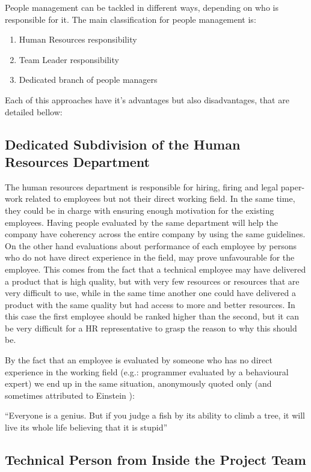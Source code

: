 People management can be tackled in different ways, depending on who is responsible for it. The main classification for people management is:
\begin{enumerate}
\item Human Resources responsibility
\item Team Leader responsibility 
\item Dedicated branch of people managers
\end{enumerate}

Each of this approaches have it's advantages but also disadvantages, that are detailed bellow:
\subsection{Dedicated Subdivision of the Human Resources Department}
\label{subsec:hrdep}

The human resources department is responsible for hiring, firing and legal paper-work related to employees but not their direct working field. In the same time, they could be in charge with ensuring enough motivation for the existing employees. Having people evaluated by the same department will help the company have coherency across the entire company by using the same guidelines. On the other hand evaluations about performance of each employee by persons who do not have direct experience in the field, may prove unfavourable for the employee. This comes from the fact that a technical employee may have delivered a product that is high quality, but with very few resources or resources that are very difficult to use, while in the same time another one could have delivered a product with the same quality but had access to more and better resources. In this case the first employee should be ranked higher than the second, but it can be very difficult for a HR representative to grasp the reason to why this should be. 

By the fact that an employee is evaluated by someone who has no direct experience in the working field (e.g.: programmer evaluated by a behavioural expert) we end up in the same situation, anonymously quoted only (and sometimes attributed to Einstein \cite{aeq}): 
\begin{displayquote}
``Everyone is a genius. But if you judge a fish by its ability to climb a tree, it will live its whole life believing that it is stupid''
\end{displayquote}

\subsection{Technical Person from Inside the Project Team}
\label{subsec:techin}

